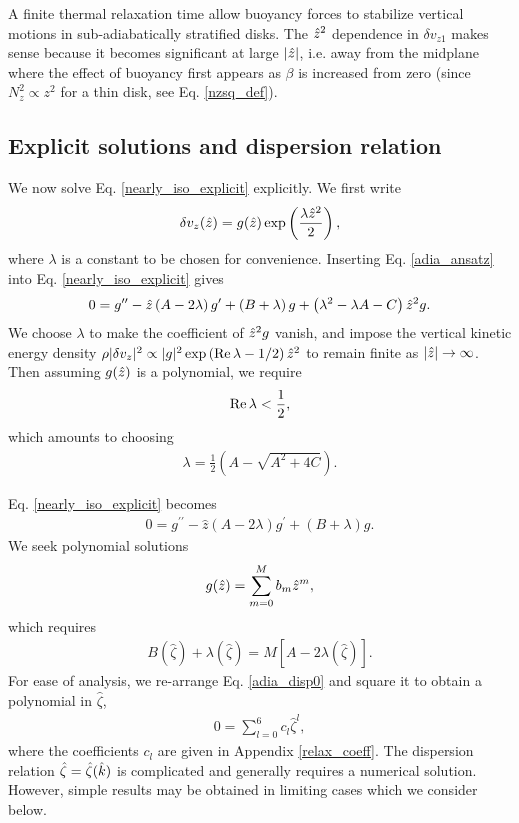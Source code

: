 A finite thermal relaxation time allow buoyancy
forces to stabilize vertical motions in sub-adiabatically stratified
disks. The $\hat{z}^2$ dependence in $\delta v_{z1}$ makes  
sense because it becomes significant at large $|\hat{z}|$, i.e. away from
the midplane where the effect of buoyancy first appears as $\beta$ is
increased from zero (since $N_z^2\propto z^2$ for a thin disk, see
Eq. \ref{nzsq_def}).   

\subsection{Explicit solutions and dispersion relation}\label{disp_relax}
We now solve Eq. \ref{nearly_iso_explicit} explicitly. We first write  
\begin{align}
  \delta v_z(\hat{z}) =
  g(\hat{z})\exp\left(\frac{\lambda\hat{z}^2}{2}\right), \label{adia_ansatz}
\end{align}
where $\lambda$ is a constant to be chosen for convenience. Inserting
Eq. \ref{adia_ansatz} into Eq. \ref{nearly_iso_explicit} gives
\begin{align}
  0 = g^{\prime\prime} - \hat{z}\left(A - 2\lambda\right)g^\prime + \left(B +
    \lambda\right)g
  +\left(\lambda^2 - \lambda A - C\right)\hat{z}^2 g.
\end{align}
We choose $\lambda$ to make the coefficient of $\hat{z}^2g$
vanish, and impose the vertical kinetic energy density
$\rho|\delta v_z|^2\propto |g|^2 \exp{\left(\operatorname{Re}\lambda -
    1/2\right)\hat{z}^2}$ to remain finite as $|\hat{z}|\to\infty$. 
Then assuming $g(\hat{z})$ is a polynomial, we require  
\begin{align}
  \operatorname{Re}\lambda < \frac{1}{2}, 
\end{align}
which amounts to choosing 
\begin{align}
  \lambda = \frac{1}{2}\left(A - \sqrt{A^2 + 4C}\right).  
\end{align} 


Eq. \ref{nearly_iso_explicit} becomes 
\begin{align}
  0 = g^{\prime\prime} - \hat{z}\left(A - 2\lambda\right)g^\prime +
  \left(B + \lambda\right)g.
\end{align}
We seek polynomial solutions 
\begin{align}
  g(\hat{z}) = \sum_{m=0}^M b_m \hat{z}^m,
\end{align}
which requires
\begin{align}
  B(\hat{\zeta}) + \lambda(\hat{\zeta}) =
  M\left[A-2\lambda(\hat{\zeta})\right].\label{adia_disp0} 
\end{align}
For ease of analysis, we re-arrange Eq. \ref{adia_disp0} and square it
to obtain a polynomial in $\hat{\zeta}$,  
\begin{align}
  0 = \sum_{l=0}^{6}c_l\hat{\zeta}^l,\label{relax_disp}
\end{align}
where the coefficients $c_l$ are given in Appendix \ref{relax_coeff}.
The dispersion relation $\hat{\zeta}=\hat{\zeta}(\hat{k})$ is
complicated and generally requires a numerical solution. However,
simple results may be obtained in limiting cases which we consider
below.  

